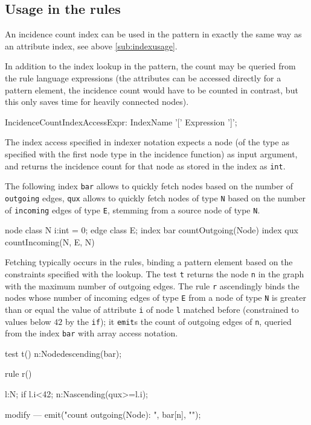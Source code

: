 \subsection*{Usage in the rules}
An incidence count index can be used in the pattern in exactly the same way as an attribute index, see above \ref{sub:indexusage}.

In addition to the index lookup in the pattern, 
the count may be queried from the rule language expressions (the attributes can be accessed directly for a pattern element, the incidence count would have to be counted in contrast, but this only saves time for heavily connected nodes).

\begin{rail}
  IncidenceCountIndexAccessExpr:
    IndexName '[' Expression ']';
\end{rail}

The index access specified in indexer notation expects a node (of the type as specified with the first node type in the incidence function) as input argument, and returns the incidence count for that node as stored in the index as \texttt{int}.

\begin{example}
The following index \texttt{bar} allows to quickly fetch nodes based on the number of \texttt{outgoing} edges, \texttt{qux} allows to quickly fetch nodes of type \texttt{N} based on the number of \texttt{incoming} edges of type \texttt{E}, stemming from a source node of type \texttt{N}.

\begin{grgen}
node class N {
	i:int = 0;
}
edge class E;
index bar { countOutgoing(Node) }
index qux { countIncoming(N, E, N) }
\end{grgen}

Fetching typically occurs in the rules, binding a pattern element based on the constraints specified with the lookup.
The test \texttt{t} returns the node \texttt{n} in the graph with the maximum number of outgoing edges.
The rule \texttt{r} ascendingly binds the nodes whose number of incoming edges of type \texttt{E} from a node of type \texttt{N} is greater than or equal the value of attribute \texttt{i} of node \texttt{l} matched before (constrained to values below $42$ by the \texttt{if}); it \texttt{emit}s the count of outgoing edges of \texttt{n}, queried from the index \texttt{bar} with array access notation.

\begin{grgen}
test t() {
	n:Node{descending(bar)};
}

rule r() {
  l:N; if{ l.i<42;}
  n:N{ascending(qux>=l.i)};
	
  modify {
  ---
    emit("count outgoing(Node): ", bar[n], "\n");
  }
}
\end{grgen}

\end{example}

